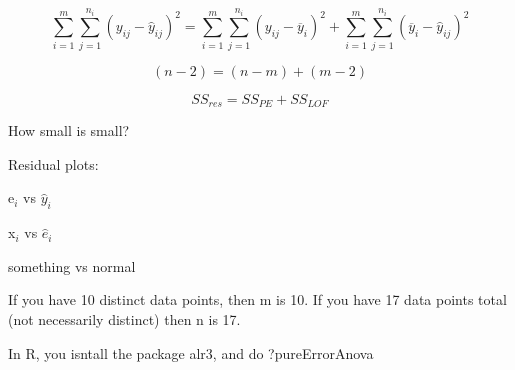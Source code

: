 \documentclass{article}
\newcommand{\mt}[1]{\ensuremath{#1}}
\newcommand{\uw}[2]{#1\mt{_{#2}}}
\newcommand{\eqn}[1]{\[#1\]}
\newcommand{\mn}[1]{\mt{\overline{#1}}}
\begin{document}
\eqn{\sum_{i = 1}^m\sum_{j = 1}^{n_i} (y_{ij} - \hat y_{ij})^2 = \sum_{i = 1}^m\sum_{j = 1}^{n_i} (y_{ij} - \mn{y}_{i})^2 + \sum_{i = 1}^m\sum_{j = 1}^{n_i} (\mn{y}_{i} - \hat y_{ij})^2}

\eqn{(n - 2) = (n - m) + (m - 2)}

\eqn{SS_{res} = SS_{PE} + SS_{LOF}}

How small is small?

Residual plots:

\uw{e}{i} vs $\hat y_i$

\uw{x}{i} vs $\hat e_i$

something vs normal 

If you have 10 distinct data points, then m is 10. If you have 17 data points total (not necessarily distinct) then n is 17.

In R, you isntall the package alr3, and do ?pureErrorAnova
\end{document}
